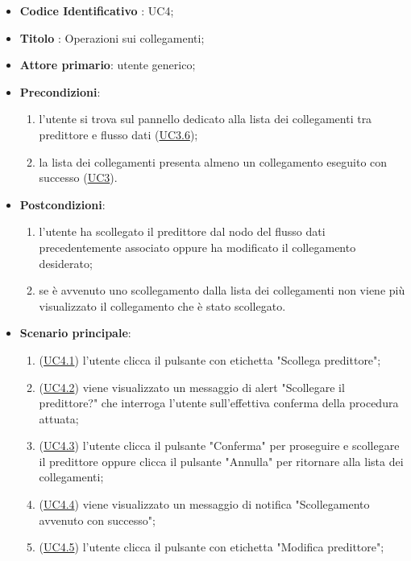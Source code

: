 		\begin{itemize}
			\item\textbf{Codice Identificativo} : UC4;
			\item\textbf{Titolo} : Operazioni sui collegamenti;
			\item\textbf{Attore primario}: utente generico;
			\item\textbf{Precondizioni}:
				\begin{enumerate}
					\item l'utente si trova sul pannello dedicato alla lista dei collegamenti tra predittore e flusso dati (\hyperref[par:UC3.6]{UC3.6});
					\item la lista dei collegamenti presenta almeno un collegamento eseguito con successo (\hyperref[par:UC3]{UC3}).
				\end{enumerate}
			\item\textbf{Postcondizioni}:
				\begin{enumerate}
					\item l'utente ha scollegato il predittore dal nodo del flusso dati precedentemente associato oppure ha modificato il collegamento desiderato;
					\item se è avvenuto uno scollegamento dalla lista dei collegamenti non viene più visualizzato il collegamento che è stato scollegato.
				\end{enumerate}
			\item\textbf{Scenario principale}: 
			\begin{enumerate} 
				\item (\hyperref[par:UC4.1]{UC4.1}) l'utente clicca il pulsante con etichetta "Scollega predittore";
				\item (\hyperref[par:UC4.2]{UC4.2}) viene visualizzato un messaggio di alert "Scollegare il predittore?" che interroga l'utente sull'effettiva conferma della procedura attuata;
				\item (\hyperref[par:UC4.3]{UC4.3}) l'utente clicca il pulsante "Conferma" per proseguire e scollegare il predittore oppure clicca il pulsante "Annulla" per ritornare alla lista dei collegamenti;	
				\item (\hyperref[par:UC4.4]{UC4.4}) viene visualizzato un messaggio di notifica "Scollegamento avvenuto con successo";
				\item (\hyperref[par:UC4.5]{UC4.5}) l'utente clicca il pulsante con etichetta "Modifica predittore";
			\end{enumerate}
	\end{itemize}
		
